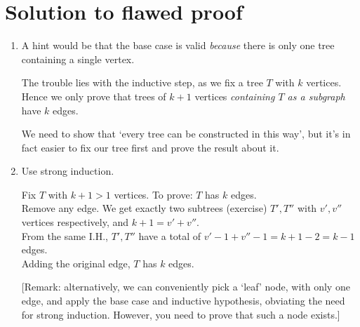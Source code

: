 \documentclass[10pt,a4paper]{article}
\begin{document}
\section{Solution to flawed proof}
\begin{enumerate}
    \item A hint would be that the base case is valid \emph{because} there is only one tree containing a single vertex.

    The trouble lies with the inductive step, as we fix a tree \(T\) with \(k\) vertices.
    Hence we only prove that trees of \(k+1\) vertices \emph{containing \(T\) as a subgraph} have \(k\) edges.

    We need to show that `every tree can be constructed in this way', but it's in fact easier to fix our tree first and prove the result about it.

    \item Use strong induction.
    
    Fix \(T\) with \(k+1 > 1\) vertices. To prove: \(T\) has \(k\) edges.\\
    Remove any edge. We get exactly two subtrees (exercise) \(T', T''\) with \(v', v''\) vertices respectively, and \(k+1 = v' + v''\).\\
    From the same I.H., \(T', T''\) have a total of \(v'-1 + v''-1 = k+1-2 = k-1\) edges.\\
    Adding the original edge, \(T\) has \(k\) edges.

    [Remark: alternatively, we can conveniently pick a `leaf' node, with only one edge, and apply the base case and inductive hypothesis, obviating the need for strong induction. However, you need to prove that such a node exists.]
\end{enumerate}
\end{document}
